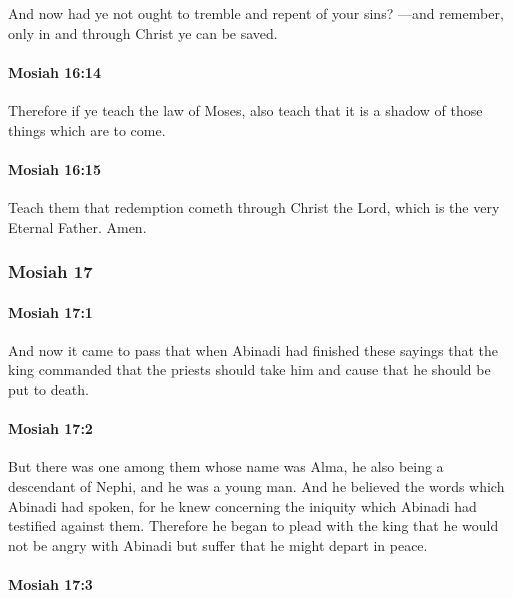 			And now had ye not ought to tremble and repent of your sins?
			---and remember, only in and through Christ ye can be saved.

		\paragraph{Mosiah 16:14} %
			\label{MOSIAH-16-14}

			Therefore if ye teach the law of Moses,
			also teach that it is a shadow of those things which are to come.

		\paragraph{Mosiah 16:15} %
			\label{MOSIAH-16-15}

			Teach them that redemption cometh through Christ the Lord,
			which is the very Eternal Father.
			Amen.

	\subsubsection{Mosiah 17} %
		\label{MOSIAH-17}
		
		\paragraph{Mosiah 17:1} %
			\label{MOSIAH-17-1}

			And now it came to pass that when Abinadi had finished these sayings
			that the king commanded that the priests should take him
			and cause that he should be put to death.

		\paragraph{Mosiah 17:2} %
			\label{MOSIAH-17-2}

			But there was one among them whose name was Alma,
			he also being a descendant of Nephi,
			and he was a young man.
			And he believed the words which Abinadi had spoken,
			for he knew concerning the iniquity which Abinadi had testified against them.
			Therefore he began to plead with the king
			that he would not be angry with Abinadi
			but suffer that he might depart in peace.

		\paragraph{Mosiah 17:3} %
			\label{MOSIAH-17-3}

